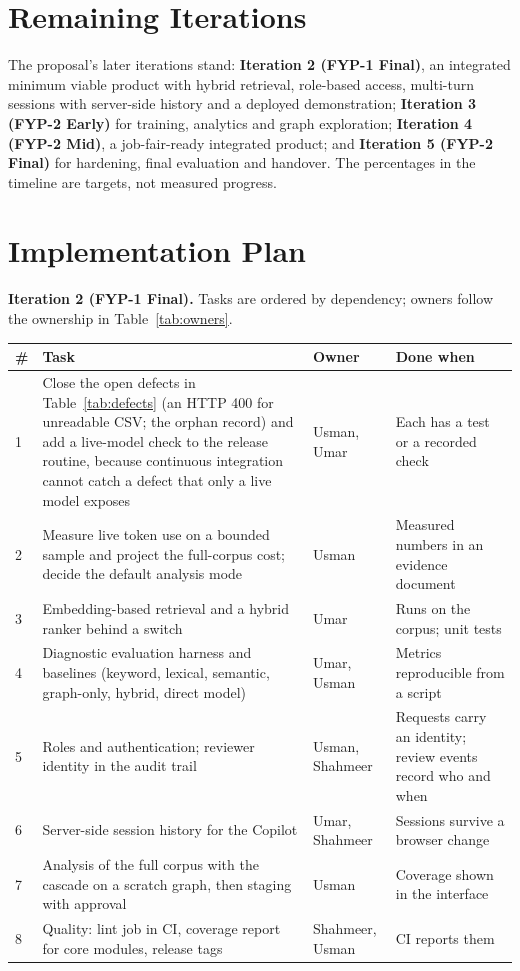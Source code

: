 \section{Remaining Iterations}
The proposal's later iterations stand: \textbf{Iteration 2 (FYP-1 Final)}, an integrated minimum viable product with hybrid retrieval, role-based access, multi-turn sessions with server-side history and a deployed demonstration; \textbf{Iteration 3 (FYP-2 Early)} for training, analytics and graph exploration; \textbf{Iteration 4 (FYP-2 Mid)}, a job-fair-ready integrated product; and \textbf{Iteration 5 (FYP-2 Final)} for hardening, final evaluation and handover. The percentages in the timeline are targets, not measured progress.

\section{Implementation Plan}
\textbf{Iteration 2 (FYP-1 Final).} Tasks are ordered by dependency; owners follow the ownership in Table~\ref{tab:owners}.
\begin{longtable}{p{}p{}p{}p{}}
\toprule \textbf{\#} & \textbf{Task} & \textbf{Owner} & \textbf{Done when} \\ \midrule \endhead
1 & Close the open defects in Table~\ref{tab:defects} (an HTTP 400 for unreadable CSV; the orphan record) and add a live-model check to the release routine, because continuous integration cannot catch a defect that only a live model exposes & Usman, Umar & Each has a test or a recorded check \\
2 & Measure live token use on a bounded sample and project the full-corpus cost; decide the default analysis mode & Usman & Measured numbers in an evidence document \\
3 & Embedding-based retrieval and a hybrid ranker behind a switch & Umar & Runs on the corpus; unit tests \\
4 & Diagnostic evaluation harness and baselines (keyword, lexical, semantic, graph-only, hybrid, direct model) & Umar, Usman & Metrics reproducible from a script \\
5 & Roles and authentication; reviewer identity in the audit trail & Usman, Shahmeer & Requests carry an identity; review events record who and when \\
6 & Server-side session history for the Copilot & Umar, Shahmeer & Sessions survive a browser change \\
7 & Analysis of the full corpus with the cascade on a scratch graph, then staging with approval & Usman & Coverage shown in the interface \\
8 & Quality: lint job in CI, coverage report for core modules, release tags & Shahmeer, Usman & CI reports them \\
\bottomrule
\end{longtable}

